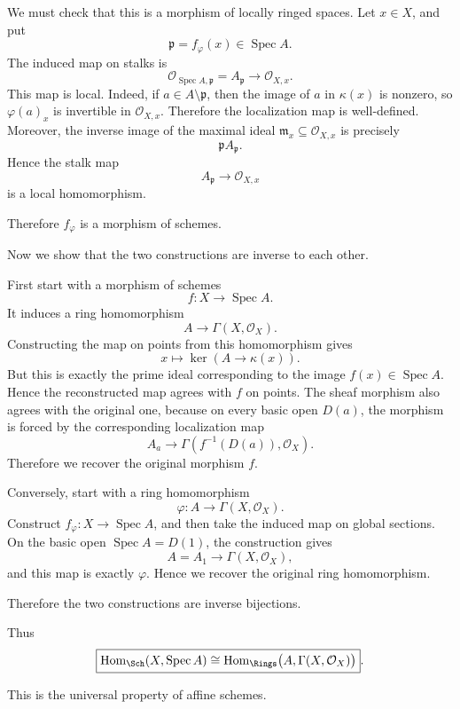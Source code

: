 We must check that this is a morphism of locally ringed spaces. Let \(x\in X\), and put
\[
\mathfrak p=f_\varphi(x)\in \operatorname{Spec} A.
\]
The induced map on stalks is
\[
\mathcal O_{\operatorname{Spec} A,\mathfrak p}=A_{\mathfrak p}
\longrightarrow
\mathcal O_{X,x}.
\]
This map is local. Indeed, if \(a\in A\setminus \mathfrak p\), then the image of \(a\) in \(\kappa(x)\) is nonzero, so \(\varphi(a)_x\) is invertible in \(\mathcal O_{X,x}\). Therefore the localization map is well-defined. Moreover, the inverse image of the maximal ideal \(\mathfrak m_x\subseteq \mathcal O_{X,x}\) is precisely
\[
\mathfrak pA_{\mathfrak p}.
\]
Hence the stalk map
\[
A_{\mathfrak p}\to \mathcal O_{X,x}
\]
is a local homomorphism.

Therefore \(f_\varphi\) is a morphism of schemes.

Now we show that the two constructions are inverse to each other.

First start with a morphism of schemes
\[
f:X\to \operatorname{Spec} A.
\]
It induces a ring homomorphism
\[
A\to \Gamma(X,\mathcal O_X).
\]
Constructing the map on points from this homomorphism gives
\[
x\longmapsto
\ker\left(A\to \kappa(x)\right).
\]
But this is exactly the prime ideal corresponding to the image \(f(x)\in \operatorname{Spec} A\). Hence the reconstructed map agrees with \(f\) on points. The sheaf morphism also agrees with the original one, because on every basic open \(D(a)\), the morphism is forced by the corresponding localization map
\[
A_a\to \Gamma(f^{-1}(D(a)),\mathcal O_X).
\]
Therefore we recover the original morphism \(f\).

Conversely, start with a ring homomorphism
\[
\varphi:A\to \Gamma(X,\mathcal O_X).
\]
Construct \(f_\varphi:X\to \operatorname{Spec} A\), and then take the induced map on global sections. On the basic open \(\operatorname{Spec} A=D(1)\), the construction gives
\[
A=A_1
\longrightarrow
\Gamma(X,\mathcal O_X),
\]
and this map is exactly \(\varphi\). Hence we recover the original ring homomorphism.

Therefore the two constructions are inverse bijections.

Thus
\[
\boxed{
	\operatorname{Hom}_{\Sch}(X,\operatorname{Spec} A)
	\cong
	\operatorname{Hom}_{\Rings}\bigl(A,\Gamma(X,\mathcal O_X)\bigr)
}.
\]

This is the universal property of affine schemes.
